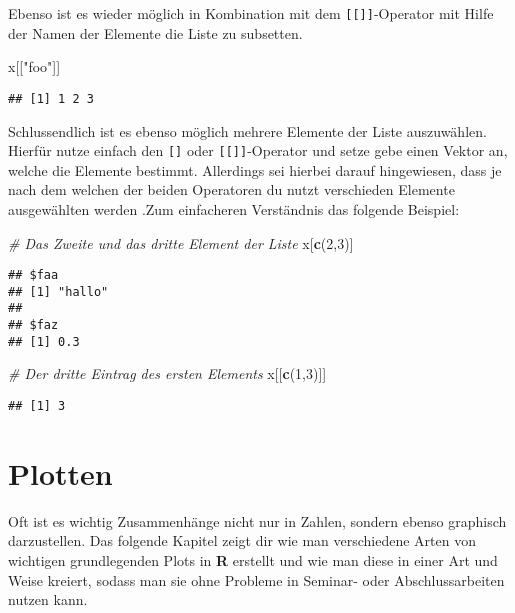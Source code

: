 \documentclass[
]{book}
\newenvironment{Shaded}{\begin{snugshade}}{\end{snugshade}}
\newcommand{\CommentTok}[1]{\textcolor[rgb]{0.56,0.35,0.01}{\textit{#1}}}
\newcommand{\DecValTok}[1]{\textcolor[rgb]{0.00,0.00,0.81}{#1}}
\newcommand{\KeywordTok}[1]{\textcolor[rgb]{0.13,0.29,0.53}{\textbf{#1}}}
\newcommand{\NormalTok}[1]{#1}
\newcommand{\StringTok}[1]{\textcolor[rgb]{0.31,0.60,0.02}{#1}}
\begin{document}
Ebenso ist es wieder möglich in Kombination mit dem \texttt{{[}{[}{]}{]}}-Operator mit Hilfe der Namen der Elemente die Liste zu subsetten.

\begin{Shaded}
\begin{Highlighting}[]
\NormalTok{x[[}\StringTok{"foo"}\NormalTok{]]}
\end{Highlighting}
\end{Shaded}

\begin{verbatim}
## [1] 1 2 3
\end{verbatim}

Schlussendlich ist es ebenso möglich mehrere Elemente der Liste auszuwählen. Hierfür nutze einfach den \texttt{{[}{]}} oder \texttt{{[}{[}{]}{]}}-Operator und setze gebe einen Vektor an, welche die Elemente bestimmt. Allerdings sei hierbei darauf hingewiesen, dass je nach dem welchen der beiden Operatoren du nutzt verschieden Elemente ausgewählten werden .Zum einfacheren Verständnis das folgende Beispiel:

\begin{Shaded}
\begin{Highlighting}[]
\CommentTok{# Das Zweite und das dritte Element der Liste}
\NormalTok{x[}\KeywordTok{c}\NormalTok{(}\DecValTok{2}\NormalTok{,}\DecValTok{3}\NormalTok{)]}
\end{Highlighting}
\end{Shaded}

\begin{verbatim}
## $faa
## [1] "hallo"
## 
## $faz
## [1] 0.3
\end{verbatim}

\begin{Shaded}
\begin{Highlighting}[]
\CommentTok{# Der dritte Eintrag des ersten Elements }
\NormalTok{x[[}\KeywordTok{c}\NormalTok{(}\DecValTok{1}\NormalTok{,}\DecValTok{3}\NormalTok{)]]}
\end{Highlighting}
\end{Shaded}

\begin{verbatim}
## [1] 3
\end{verbatim}

\hypertarget{plotten}{%
\chapter{Plotten}\label{plotten}}

Oft ist es wichtig Zusammenhänge nicht nur in Zahlen, sondern ebenso graphisch darzustellen.
Das folgende Kapitel zeigt dir wie man verschiedene Arten von wichtigen grundlegenden Plots in \textbf{R} erstellt und wie man diese in einer Art und Weise kreiert, sodass man sie ohne Probleme in Seminar- oder Abschlussarbeiten nutzen kann.
\end{document}
